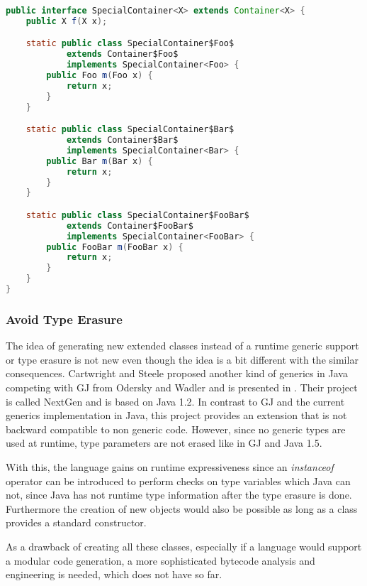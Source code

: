 \begin{lstlisting}[language=java,caption=Extending a container class translated to Java,label=lst:extendingContainer]
public interface SpecialContainer<X> extends Container<X> {
	public X f(X x);

	static public class SpecialContainer$Foo$
			extends Container$Foo$
			implements SpecialContainer<Foo> {
		public Foo m(Foo x) {
			return x;
		}
	}

	static public class SpecialContainer$Bar$
			extends Container$Bar$
			implements SpecialContainer<Bar> {
		public Bar m(Bar x) {
			return x;
		}
	}

	static public class SpecialContainer$FooBar$
			extends Container$FooBar$
			implements SpecialContainer<FooBar> {
		public FooBar m(FooBar x) {
			return x;
		}
	}
}
\end{lstlisting}

\subsubsection{Avoid Type Erasure}
The idea of generating new extended classes instead of a runtime generic
support or type erasure is not new even though the idea is a bit different
with the similar consequences.  Cartwright and Steele proposed
another kind of generics in Java competing with GJ from Odersky and
Wadler and is presented in \cite{cartwright_compatible_1998}. Their
project is called NextGen and is based on Java 1.2. In contrast to GJ
and the current generics implementation in Java, this project provides an
extension that is not backward compatible to non generic code. However,
since no generic types are used at runtime, type parameters are not
erased like in GJ and Java 1.5.

With this, the language gains on runtime expressiveness since an
\emph{instanceof} operator can be introduced to perform checks on type
variables which Java can not, since Java has not runtime type information
after the type erasure is done. Furthermore the creation of new objects
would also be possible as long as a class provides a standard constructor.

As a drawback of creating all these classes, especially  if a language
would support a modular code generation, a more sophisticated bytecode
analysis and engineering is needed, which \ooplss does not have so far.

